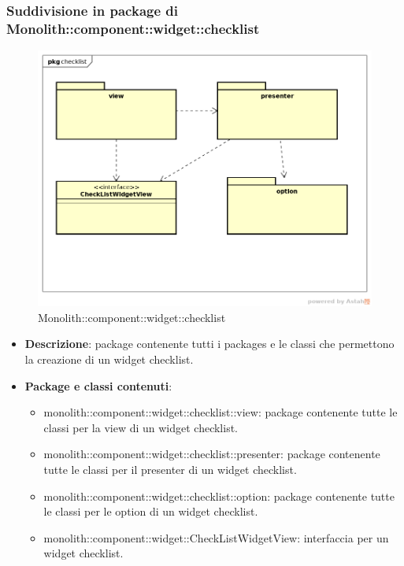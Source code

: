 \subsubsection{Suddivisione in package  di Monolith::component::widget::checklist}
\label{Monolith::component::widget::checklist}
\begin{figure}[H]
	\centering
	\includegraphics[scale=0.5]{Sezioni/imgPackage/component_widget_checklist.png}
	\caption{Monolith::component::widget::checklist}
\end{figure}
\begin{itemize}
	\item{\textbf{Descrizione}}: package contenente tutti i packages e le classi che permettono la creazione di un widget checklist.
	\item{\textbf{Package e classi contenuti}}:
	\begin{itemize}
	\item{monolith::component::widget::checklist::view}: package contenente tutte le classi per la view di un widget checklist.
	\item{monolith::component::widget::checklist::presenter}: package contenente tutte le classi per il presenter di un widget checklist.
	\item{monolith::component::widget::checklist::option}: package contenente tutte le classi per le option di un widget checklist.
	\item{monolith::component::widget::CheckListWidgetView}: interfaccia per un widget checklist.
	\end{itemize}

\end{itemize}


